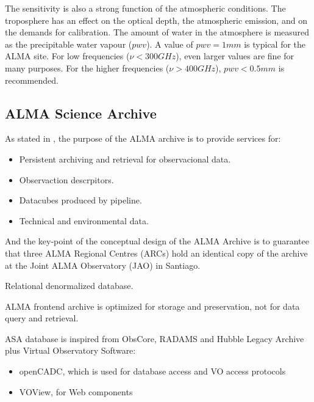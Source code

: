 The sensitivity is also a strong function of the atmospheric conditions. The troposphere has an effect on the optical depth, the atmospheric emission, and on the demands for calibration. The amount of water in the atmosphere is measured as the precipitable water vapour ($pwv$). A value of $pwv=1 mm$ is typical for the ALMA site. For low frequencies ($\nu<300 GHz$), even larger values are fine for many purposes. For the higher frequencies ($\nu>400 GHz$), $pwv<0.5 mm$ is recommended.



\subsection{ALMA Science Archive}

As stated in \cite{Etoka12}, the purpose of the ALMA archive is to provide services for:

\begin{itemize}
\item Persistent archiving and retrieval for observacional data.
\item Observaction descrpitors.
\item Datacubes produced by pipeline.
\item Technical and environmental data.
\end{itemize}

And the key-point of the conceptual design of the ALMA Archive is to guarantee that three ALMA Regional Centres (ARCs) hold an identical copy of the archive at the Joint ALMA Observatory (JAO) in Santiago. 

Relational denormalized database.

ALMA frontend archive is optimized for storage and preservation, not for data query and retrieval.

ASA database is inspired from ObsCore, RADAMS and Hubble Legacy Archive plus Virtual Observatory Software:

\begin{itemize}

\item openCADC, which is used for database access and VO access protocols
\item VOView, for Web components

\end{itemize}


